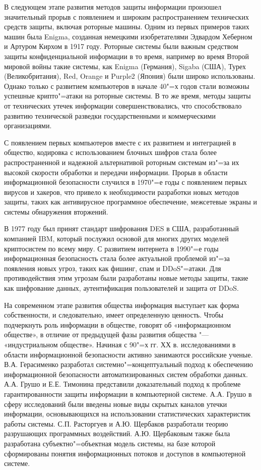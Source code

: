 В следующем этапе развития методов защиты информации произошел значительный прорыв с появлением и широким распространением 
технических средств защиты, включая роторные машины. Одним из первых примеров таких машин была Enigma, созданная немецкими 
изобретателями Эдвардом Хеберном и Артуром Кирхом в 1917 году. Роторные системы были важным средством защиты конфиденциальной 
информации в то время, например во время Второй мировой войны такие системы, как Enigma (Германия), Sigaba (США), Турех 
(Великобритания), Red, Orange и Purple2 (Япония) были широко использованы. Однако только с развитием компьютеров в начале 
40"=х годов стали возможны успешные крипто"=атаки на роторные системы. В то же время, методы защиты от технических утечек 
информации совершенствовались, что способствовало развитию технической разведки государственными и коммерческими 
организациями.

С появлением первых компьютеров вместе с их развитием и интеграцией в общество, кодировка с использованием блочных шифров стала более распространенной и надежной альтернативой роторным системам из"=за их высокой скорости обработки и передачи 
информации. Прорыв в области информационной безопасности случился в 1970"=е годы с появлением первых вирусов и хакеров, что 
привело к необходимости разработки новых методов защиты, таких как антивирусное программное обеспечение, межсетевые экраны и 
системы обнаружения вторжений.

В 1977 году был принят стандарт шифрования DES в США, разработанный компанией IBM, который послужил основой для многих других 
моделей криптосистем по всему миру. С развитием интернета в 1990"=е годы информационная безопасность стала более актуальной 
проблемой из"=за появления новых угроз, таких как фишинг, спам и DDoS"=атаки. Для противодействия этим угрозам были разработаны 
новые методы защиты, такие как шифрование данных, аутентификация пользователей и защита от DDoS\cite{sforum}.

На современном этапе развития общества информация выступает как форма собственности, и следовательно, имеет определенную 
ценность. Чтобы подчеркнуть роль информации в обществе, говорят об «информационном обществе», в отличие от предыдущей фазы 
развития общества "---  «индустриальном обществе». Начиная с 90"=х гг. ХХ в. исследованиями в области информационной безопасности 
активно занимаются российские ученые. В.А. Герасименко разработал системно"=концептуальный подход к обеспечению информационной 
безопасности автоматизированных систем обработки данных. А.А. Грушо и Е.Е. Тимонина представили доказательный подход к 
проблеме гарантированности защиты информации в компьютерной системе. А.А. Грушо в сферу исследований были введены новые виды 
скрытых каналов утечки информации, основывающихся на использовании статистических характеристик работы системы. С.П. 
Расторгуев и А.Ю. Щербаков разработали теорию разрушающих программных воздействий. А.Ю. Щербаковым также была разработана 
субъектно"=объектная модель системы, на базе которой сформированы понятия информационных потоков и доступов в компьютерной 
системе. 

